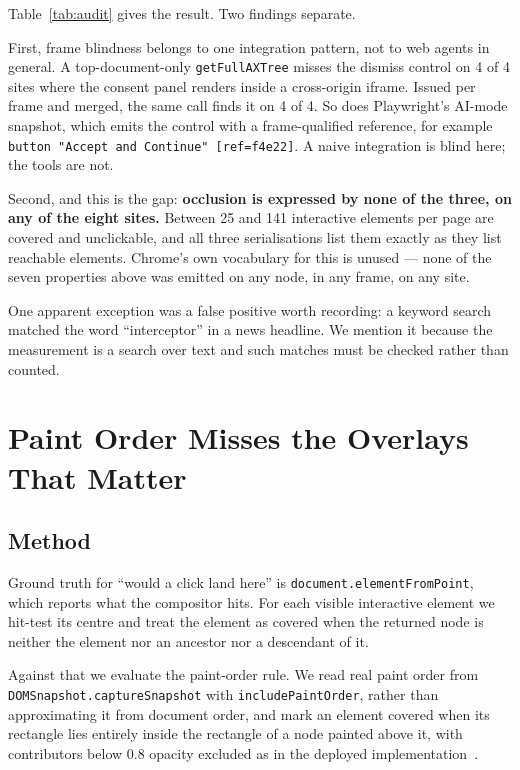 \documentclass[conference]{IEEEtran}
\begin{document}
Table~\ref{tab:audit} gives the result. Two findings separate.

First, frame blindness belongs to one integration pattern, not to web agents
in general. A top-document-only \texttt{getFullAXTree} misses the dismiss
control on 4 of 4 sites where the consent panel renders inside a cross-origin
iframe. Issued per frame and merged, the same call finds it on 4 of 4. So does
Playwright's AI-mode snapshot, which emits the control with a frame-qualified
reference, for example \texttt{button "Accept and Continue" [ref=f4e22]}. A
naive integration is blind here; the tools are not.

Second, and this is the gap: \textbf{occlusion is expressed by none of the
three, on any of the eight sites.} Between 25 and 141 interactive elements per
page are covered and unclickable, and all three serialisations list them
exactly as they list reachable elements. Chrome's own vocabulary for this is
unused --- none of the seven properties above was emitted on any node, in any
frame, on any site.

One apparent exception was a false positive worth recording: a keyword search
matched the word ``interceptor'' in a news headline. We mention it because the
measurement is a search over text and such matches must be checked rather than
counted.

\section{Paint Order Misses the Overlays That Matter}
\label{sec:paint}

\subsection{Method}

Ground truth for ``would a click land here'' is
\texttt{document.elementFromPoint}, which reports what the compositor hits.
For each visible interactive element we hit-test its centre and treat the
element as covered when the returned node is neither the element nor an
ancestor nor a descendant of it.

Against that we evaluate the paint-order rule. We read real paint order from
\texttt{DOMSnapshot.captureSnapshot} with \texttt{includePaintOrder}, rather
than approximating it from document order, and mark an element covered when its
rectangle lies entirely inside the rectangle of a node painted above it, with
contributors below 0.8 opacity excluded as in the deployed
implementation~\cite{browseruse}.
\end{document}
